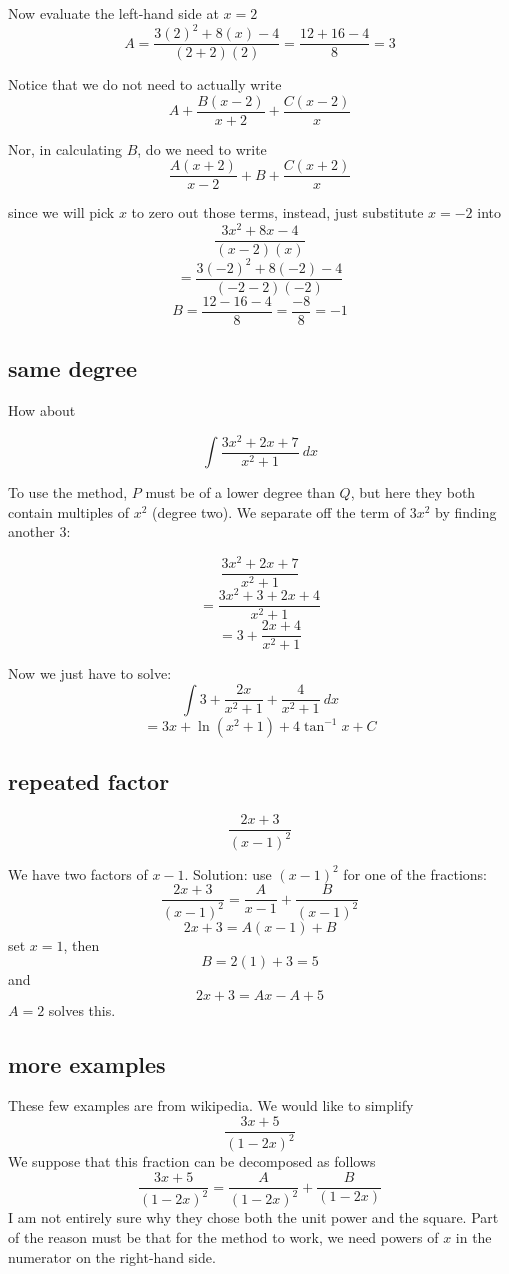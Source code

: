 \documentclass[11pt, oneside]{article}   	%
\begin{document}
Now evaluate the left-hand side at $x=2$
\[ A = \frac{3(2)^2 + 8(x) - 4}{(2+2)(2)} = \frac{12 + 16 - 4}{8} = 3 \]

Notice that we do not need to actually write 
\[ A +  \frac{B(x-2)}{x+2} + \frac{C(x-2)}{x} \]

Nor, in calculating $B$, do we need to write
\[ \frac{A(x+2)}{x-2} + B + \frac{C(x+2)}{x} \]

since we will pick $x$ to zero out those terms, instead, just substitute $x=-2$ into
\[ \frac{3x^2 + 8x - 4}{(x-2)(x)} \]
\[ = \frac{3(-2)^2 + 8(-2) - 4}{(-2-2)(-2)} \]
\[ B = \frac{12 - 16 -4}{8} = \frac{-8}{8} = -1 \]

\subsection*{same degree}

How about 

\[ \int \frac{3x^2 + 2x + 7}{x^2 + 1} \ dx \]

To use the method, $P$ must be of a lower degree than $Q$, but here they both contain multiples of $x^2$ (degree two).  We separate off the term of $3x^2$ by finding another $3$:

\[ \frac{3x^2 + 2x + 7}{x^2 + 1} \]
\[ = \frac{3x^2 + 3 + 2x + 4}{x^2 + 1} \]
\[ = 3 + \frac{2x + 4}{x^2 + 1} \]

Now we just have to solve:
\[ \int 3 + \frac{2x}{x^2 + 1} + \frac{4}{x^2 + 1} \ dx \]
\[ = 3x + \ln(x^2 + 1) + 4 \tan^{-1} x + C \]

\subsection*{repeated factor}
\[ \frac{2x+3}{(x-1)^2} \]

We have two factors of $x-1$.  Solution:  use $(x-1)^2$ for one of the fractions:
\[ \frac{2x+3}{(x-1)^2} = \frac{A}{x-1} + \frac{B}{(x-1)^2} \]
\[ 2x + 3 = A(x-1) + B \]
set $x=1$, then 
\[ B = 2(1) + 3 = 5 \]
and
\[ 2x + 3 = Ax - A + 5 \]
$A=2$ solves this.

\subsection*{more examples}
These few examples are from wikipedia.  We would like to simplify
\[ \frac{3x+5}{(1-2x)^2} \]
 We suppose that this fraction can be decomposed as follows
\[ \frac{3x+5}{(1-2x)^2} = \frac{A}{(1-2x)^2} + \frac{B}{(1-2x)} \]
I am not entirely sure why they chose both the unit power and the square.  Part of the reason must be that for the method to work, we need powers of $x$ in the numerator on the right-hand side.
\end{document}
